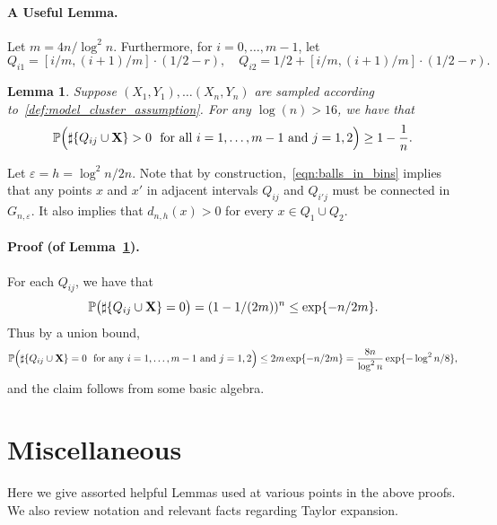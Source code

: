 \documentclass[aos]{imsart}
\theoremstyle{plain}
\newtheorem{lemma}{Lemma}
\theoremstyle{definition}
\theoremstyle{remark}
\newcommand{\Pbb}{\mathbb{P}}
\newcommand{\1}{\mathbf{1}}
\begin{document}
\paragraph{A Useful Lemma.}
Let $m = 4n/\log^2n$. Furthermore, for $i = 0,\ldots,m - 1$, let
\begin{equation*}
Q_{i1} = [i/m,(i + 1)/m] \cdot (1/2 - r), \quad Q_{i2} = 1/2 + [i/m,(i + 1)/m] \cdot (1/2 - r).
\end{equation*}
\begin{lemma}
	\label{lem:balls_in_bins}
	Suppose $(X_1,Y_1),\ldots(X_n,Y_n)$ are sampled according to~\eqref{def:model_cluster_assumption}. For any $\log(n) > 16$, we have that 
	\begin{equation}
	\label{eqn:balls_in_bins}
	\Pbb\Bigl(\sharp\{Q_{ij} \cup {\bf X}\} > 0 ~~\textrm{for all $i = 1,\ldots,m - 1$ and $j = 1,2$} \Bigr) \geq 1 - \frac{1}{n}.
	\end{equation}
\end{lemma}
Let $\varepsilon = h = \log^2n/2n$. Note that by construction,~\eqref{eqn:balls_in_bins} implies that any points $x$ and $x'$ in adjacent intervals $Q_{ij}$ and $Q_{i'j}$ must be connected in $G_{n,\varepsilon}$. It also implies that $d_{n,h}(x) > 0$ for every $x \in Q_1 \cup Q_2$.

\paragraph{Proof (of Lemma~\ref{lem:balls_in_bins}).}
For each $Q_{ij}$, we have that 
\begin{equation*}
\Pbb\bigl(\sharp\{Q_{ij} \cup {\bf X}\} = 0\bigr) = (1 - 1/(2m))^{n} \leq \exp\{-n/2m\}.
\end{equation*}
Thus by a union bound,
\begin{equation*}
\Pbb\Bigl(\sharp\{Q_{ij} \cup {\bf X}\} = 0 ~~\textrm{for any $i = 1,\ldots,m - 1$ and $j = 1,2$} \Bigr) \leq 2m\exp\{-n/2m\} = \frac{8n}{\log^2n}\exp\{-\log^2n/8\},
\end{equation*}
and the claim follows from some basic algebra. 

\section{Miscellaneous}
Here we give assorted helpful Lemmas used at various points in the above proofs. We also review notation and relevant facts regarding Taylor expansion.
\end{document}
